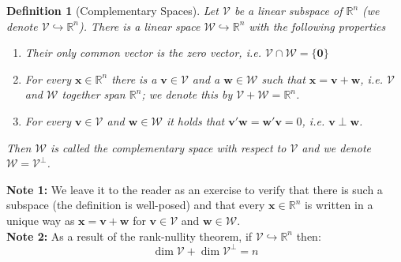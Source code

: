 \documentclass[a4paper,10pt,oneside]{book}
\newtheorem{definition}{Definition}
\begin{document}
\begin{definition}[Complementary Spaces]
 Let $\mathcal{V}$ be a linear subspace of $\mathbb{R}^n$ (we denote $\mathcal{V}\hookrightarrow \mathbb{R}^n$). There is a linear space $\mathcal{W}\hookrightarrow\mathbb{R}^n$ with the following properties
\begin{enumerate}
 \item Their only common vector is the zero vector, i.e.  $\mathcal{V}\cap\mathcal{W}=\{\mathbf{0}\}$
 \item For every $\mathbf{x}\in\mathbb{R}^n$ there is a $\mathbf{v}\in\mathcal{V}$ and a $\mathbf{w}\in\mathcal{W}$ such that $\mathbf{x}=\mathbf{v}+\mathbf{w}$, i.e. $\mathcal{V}$ and $\mathcal{W}$ together span $\mathbb{R}^n$; we denote this by $\mathcal{V}+\mathcal{W}=\mathbb{R}^n$.
 \item For every $\mathbf{v}\in\mathcal{V}$ and $\mathbf{w}\in\mathcal{W}$ it holds that $\mathbf{v}'\mathbf{w}=\mathbf{w}'\mathbf{v}=0$, i.e. $\mathbf{v}\perp\mathbf{w}$.
\end{enumerate}
Then $\mathcal{W}$ is called the complementary space with respect to $\mathcal{V}$ and we denote $\mathcal{W}=\mathcal{V}^\perp$.
\end{definition}
\noindent \textbf{Note 1:} We leave it to the reader as an exercise to verify that there is such a subspace (the definition is well-posed) and that every $\mathbf{x}\in\mathbb{R}^n$ is written in a unique way as $\mathbf{x}=\mathbf{v}+\mathbf{w}$ for $\mathbf{v}\in\mathcal{V}$ and  $\mathbf{w}\in\mathcal{W}$.\\

\noindent \textbf{Note 2:} As a result of the rank-nullity theorem, if $\mathcal{V}\hookrightarrow \mathbb{R}^n$ then:
\begin{equation}
 \operatorname{dim}\mathcal{V}+\operatorname{dim}\mathcal{V}^\perp=n
\end{equation}
\end{document}
